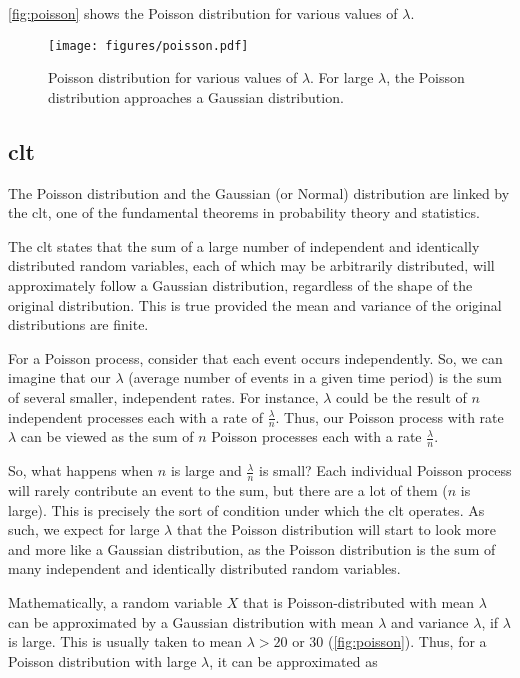 \autoref{fig:poisson} shows the Poisson distribution for various values of $\lambda$.

\begin{figure}[htb]
    \centering
    \texttt{[image: figures/poisson.pdf]}
    \caption[Poisson distribution for various values of $\lambda$]
    {Poisson distribution for various values of $\lambda$. For large $\lambda$, the Poisson distribution
        approaches a Gaussian distribution.}
    \label{fig:poisson}
\end{figure}

\subsection[Central Limit Theorem]{\acrlong{clt}}


The Poisson distribution and the Gaussian (or Normal) distribution are linked by the \gls{clt}, one of the
fundamental theorems in probability theory and statistics.

The \gls{clt} states that the sum of a large number of independent and identically distributed random
variables, each of which may be arbitrarily distributed, will approximately follow a Gaussian distribution, regardless
of the shape of the original distribution. This is true provided the mean and variance of the original distributions are
finite.

For a Poisson process, consider that each event occurs independently. So, we can imagine that our $\lambda$ (average
number of events in a given time period) is the sum of several smaller, independent rates. For instance, $\lambda$ could
be the result of $n$ independent processes each with a rate of $\frac{\lambda}{n}$. Thus, our Poisson process with rate
$\lambda$ can be viewed as the sum of $n$ Poisson processes each with a rate $\frac{\lambda}{n}$.

So, what happens when $n$ is large and $\frac{\lambda}{n}$ is small? Each individual Poisson process will rarely
contribute an event to the sum, but there are a lot of them ($n$ is large). This is precisely the sort of condition
under which the \gls{clt} operates. As such, we expect for large $\lambda$ that the Poisson distribution
will start to look more and more like a Gaussian distribution, as the Poisson distribution is the sum of many
independent and identically distributed random variables.

Mathematically, a random variable $X$ that is Poisson-distributed with mean $\lambda$ can be approximated by a Gaussian
distribution with mean $\lambda$ and variance $\lambda$, if $\lambda$ is large. This is usually taken to mean $\lambda >
    20$ or $30$ (\autoref{fig:poisson}). Thus, for a Poisson distribution with large $\lambda$, it can be
approximated as


